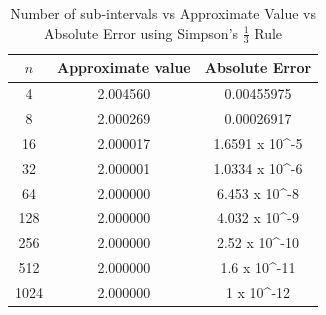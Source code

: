 \documentclass[titlepage, 11pt]{article}
\begin{document}
\begin{table}[!htb]
    \caption{Number of sub-intervals vs Approximate Value vs Absolute Error using Simpson's $\frac{1}{3}$ Rule}
    \centering
    \begin{tabular}{ccc}
    \toprule
    \textbf{$n$}& \textbf{Approximate value}& \textbf{Absolute Error}   \\
    \midrule
       4 &	 2.004560 & 0.00455975\\
8	& 2.000269	& 0.00026917 \\
16	& 2.000017	& 1.6591 x 10^{\mbox{-5}} \\
32	& 2.000001	& 1.0334 x 10^{\mbox{-6}} \\
64	& 2.000000	& 6.453 x 10^{\mbox{-8}} \\
128	& 2.000000	& 4.032 x 10^{\mbox{-9}} \\
256	& 2.000000	& 2.52 x 10^{\mbox{-10}} \\
512	& 2.000000	& 1.6 x 10^{\mbox{-11}} \\
1024 & 2.000000	& 1 x 10^{\mbox{-12}} \\

    \bottomrule
    \end{tabular}
    \label{tab:tab1c}
\end{table}

\end{document}
